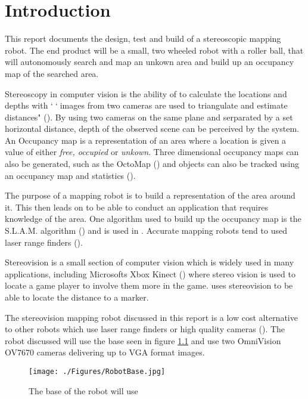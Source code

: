 \chapter{Introduction} \label{Chapter:Introduction}

%
%
%
%


This report documents the design, test and build of a stereoscopic mapping robot. The end product will be a small, two wheeled robot with a roller ball, that will autonomously search and map an unkown area and build up an occupancy map of the searched area. 

Stereoscopy in computer vision is the ability of to calculate the locations and depths with ``images from two cameras are used to triangulate and estimate distances" (\cite{Saxena:DepthEstimation}). By using two cameras on the same plane and serparated by a set horizontal distance, depth of the observed scene can be perceived by the system.
An Occupancy map is a representation of an area where a location is given a value of either \textit{free, occupied} or \textit{unkown}.  Three dimensional occupancy maps can also be generated, such as the OctoMap (\cite{octomap}) and objects can also be tracked using an occupancy map and statistics (\cite{Fleuret:OccupancyMap}). 

The purpose of a mapping robot is to build a representation of the area around it. This then leads on to be able to conduct an application that requires knowledge of the area. One algorithm used to build up the occupancy map is the S.L.A.M. algorithm (\cite{Thrun:SLAM}) and is used in \cite{Se:MappingRobot}. Accurate mapping robots tend to used laser range finders (\cite{Ruhnke:LaserMapping}).

Stereovision is a small section of computer vision which is widely used in many applications, including Microsofts Xbox Kinect (\cite{Microsoft:Kinect}) where stereo vision is used to locate a game player to involve them more in the game. \cite{Mrovlje:Distance_Stereoscopic} uses stereovision to be able to locate the distance to a marker.

The stereovision mapping robot discussed in this report is a low cost alternative to other robots which use laser range finders or high quality cameras (\cite{Se:MappingRobot}). The robot discussed will use the base seen in figure \ref{fig:RobotBase} and use two OmniVision OV7670 cameras delivering up to VGA format images.

\begin{figure}
\texttt{[image: ./Figures/RobotBase.jpg]}
\caption{The base of the robot will use}
\label{fig:RobotBase}
\end{figure}